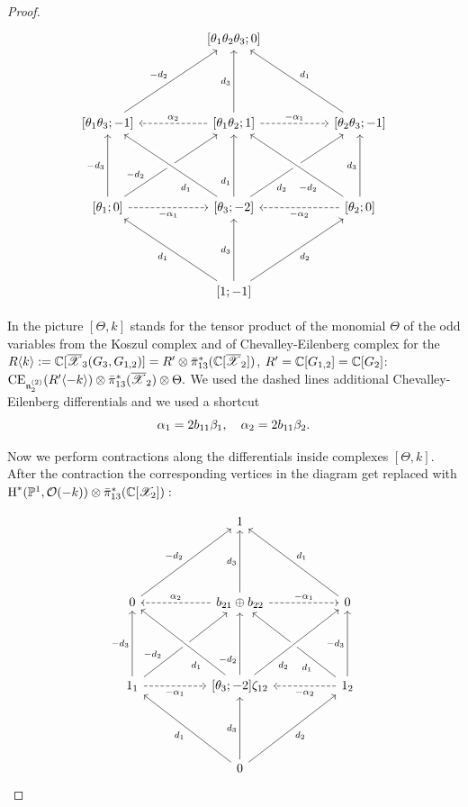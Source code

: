\begin{proof}
\[
\begin{tikzcd}[column sep=1.75cm, row sep=1.75cm]
&
\xvrt{\tho\thw\thh}{0}
\\
\xvrt{\tho\thh}{-1}
\ar{ur}{-\ydt}
&
\xvrt{\tho\thw}{1}
\ar{u}{\ydh}
\ar[dashed]{r}{-\xcfo}
\ar[dashed,']{l}{\xcft}
&
\xvrt{\thw\thh}{-1}
\ar[']{ul}{\ydo}
\\
\xvrt{\tho}{0}
\ar{u}{-\ydh}
\ar[near start]{ur}{-\ydt}
\ar[dashed,']{r}{-\xcfo}
&
\xvrt{\thh}{-2}
\ar[from=3-2,to=2-2,near start]{u}{\ydo}
\ar[crossing over, near start]{ul}{\ydo}
\ar[crossing over, near start,']{ur}{\ydt}
\ar[from=3-3,to=2-2,crossing over,near start,"-\ydt"]
&
\xvrt{\thw}{0}
\ar[dashed]{l}{-\xcft}
\ar{u}{\ydh}
\\
& \xvrt{1}{-1}
\ar{ul}{\ydo}
\ar{u}{\ydh}
\ar[']{ur}{\ydt}
\end{tikzcd}
\]



In the picture $[\Theta,k]$ stands for the tensor  product  of the  monomial $\Theta$ of the odd variables from the Koszul complex and of Chevalley-Eilenberg complex for the $R\langle k\rangle:=\mathbb{C}[\overline{\mathscr{X}}_3(G_3,G_{1,2})]=R'\otimes \bar{\pi}_{13}^*(\mathbb{C}[\overline{\mathscr{X}}_2])$, $R'=\mathbb{C}[G_{1,2}]=\mathbb{C}[G_2]$:
$\mathrm{CE}_{\mathfrak{n}_2^{(2)}}(R'\langle -k \rangle)\otimes\bar{\pi}_{13}^*(\overline{\mathscr{X}}_2)\otimes \Theta.$
We used  the dashed lines additional  Chevalley-Eilenberg differentials and we used a shortcut
$$
\alpha_1 = 2 b_{11} \beta_{1}, \quad \alpha_2  = 2 b_{11}\beta_{2}.
$$


\def\ghzot{\zeta_{12}}
Now we perform contractions along the differentials inside complexes $[\Theta,k]$. After the contraction the corresponding vertices in the diagram get replaced with
$\textup{H}^*(\mathbb{P}^1,\mathcal{O}(-k))\otimes \bar{\pi}_{13}^*(\mathbb{C}[\mathscr{X}_2]):$


\[
\begin{tikzcd}[column sep=1.75cm, row sep=1.75cm]
&
1
\\
0
\ar{ur}{-\ydt}
&
\exbto\oplus\exbtt
\ar{u}{\ydh}
\ar[dashed]{r}{-\xcfo}
\ar[',dashed]{l}{\xcft}
&
0
\ar[']{ul}{\ydo}
\\
1_1
\ar{u}{-\ydh}
\ar[near start]{ur}{-\ydt}
\ar[',dashed]{r}{-\xcfo}
&
\xvrt{\thh}{-2}
\ghzot
\ar[from=3-3,to=2-2,near start]{u}{\ydo}
\ar[crossing over, near start]{ul}{\ydo}
\ar[crossing over, near start,']{ur}{\ydt}
\ar[from=3-2,to=2-2,crossing over,near start,"-\ydt"]
&
1_2
\ar[dashed]{l}{-\xcft}
\ar{u}{-\ydh}
\\
&
0
\ar{ul}{\ydo}
\ar{u}{\ydh}
\ar[']{ur}{\ydt}
\end{tikzcd}
\]


\end{proof}
